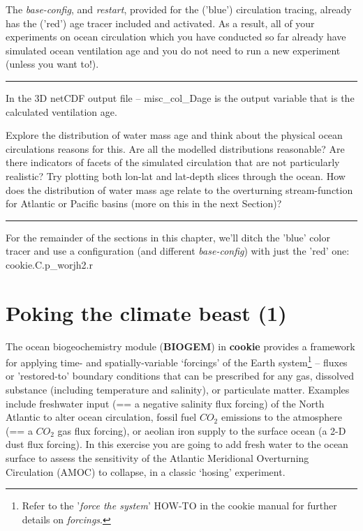 The \textit{base-config}, and \textit{restart}, provided for the ('blue') circulation tracing, already has the ('red') age tracer included and activated. As a result, all of your experiments on ocean circulation which you have conducted so far already have simulated ocean ventilation age and you do not need to run a new experiment (unless you want to!).

\vspace{1mm}\noindent\rule{4cm}{0.5pt}\vspace{2mm}

\noindent In the 3D netCDF output file -- \textsf{\footnotesize misc\_col\_Dage} is the output variable that is the calculated ventilation age.

Explore the distribution of water mass age and think about the physical ocean circulations reasons for this. Are all the modelled distributions reasonable? Are there indicators of facets of the simulated circulation that are not particularly realistic? Try plotting both lon-lat and lat-depth slices through the ocean. How does the distribution of water mass age relate to the overturning stream-function for Atlantic or Pacific basins (more on this in the next Section)?

\vspace{1mm}\noindent\rule{4cm}{0.5pt}\vspace{2mm}

\noindent For the remainder of the sections in this chapter, we'll ditch the 'blue' color tracer and use a configuration (and different \textit{base-config}) with just the 'red' one: \textsf{\footnotesize cookie.C.p\_worjh2.r}

\newpage

\section{Poking the climate beast (1)}

The ocean biogeochemistry module (\textbf{BIOGEM}) in \textbf{cookie} provides a framework for applying time- and spatially-variable ‘forcings’ of the Earth system\footnote{Refer to the '\textit{force the system}' \textsf{HOW-TO} in the cookie manual for further details on \textit{forcings}.} – fluxes or 'restored-to' boundary conditions that can be prescribed for any gas, dissolved substance (including temperature and salinity), or particulate matter. Examples include freshwater input (== a negative salinity flux forcing) of the North Atlantic to alter ocean circulation, fossil fuel \(CO_{2}\) emissions to the atmosphere (== a \(CO_{2}\) gas flux forcing), or aeolian iron supply to the surface ocean (a 2-D dust flux forcing). In this exercise you are going to add fresh water to the ocean surface to assess the sensitivity of the Atlantic Meridional Overturning Circulation (AMOC) to collapse, in a classic ‘hosing’ experiment. 

